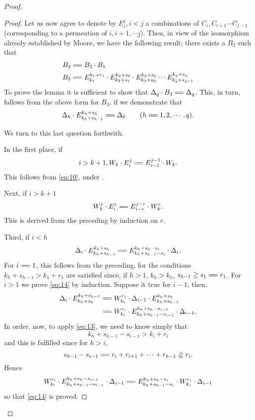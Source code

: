 \documentclass[10pt, twoside]{extarticle}
\newcommand\longeq{=\joinrel=}
\theoremstyle{breaktheorem}
\theoremstyle{mylemma}
\theoremstyle{mydefinition}
\theoremstyle{mycorollary}
\begin{document}
\begin{proof}
\begin{proof}
  Let us now agree to denote by \(E_i^j, i<j\) a combinations of \(C_i, C_{i+1} \cdots C_{j-1}\)
  (corresponding to a permeation of \(i, i+1, \cdots j\)). Then, in view of the
  isomorphism already established by Moore, we have the following result;
  there exists a \(B_3\) such that
  \begin{align*}
    B_2 &\longeq B_3 \cdot B_1 \\
    B_3 &\longeq E_{k_1}^{k_1 + r_1} \cdot E_{k_2 + s_1}^{k_2 + s_2} \cdot E_{k_3 + s_2}^{k_3 + s_3} \cdots E_{k_q + s_{q-1}}^{k_q + s_q}
  \end{align*}
  \indent To prove the lemma it is sufficient to show that \(\Delta_q \cdot B_3 \longeq \Delta_q\). This, in
  turn, follows from the above form for \(B_3\), if we demonstrate that
  \begin{equation}
    \label{eq:12}
    \Delta_h \cdot E_{k_h + s_{h-1}}^{k_h + s_h} \longeq \Delta_k \qquad (h\longeq 1, 2, \cdots, q).
  \end{equation}

  \noindent We turn to this last question forthwith.

  In the first place, if
  \[ i > k+1, W_k \cdot E_i^j \longeq E_{i-1}^{j-1} \cdot W_k. \]
  This follows from \eqref{eq:10}, under .

  Next, if \(i>k+1\)
  \begin{equation}
    \label{eq:13}
    W_k^r \cdot E_i^j \longeq E_{i-r}^{j-r} \cdot W_k^r.
  \end{equation}
  This is derived from the preceding by induction on \(r\).

  Third, if \(i < h\)
  \begin{equation}
    \label{eq:14}
    \Delta_i \cdot E_{k_h + s_{h-1}}^{k_h + s_{h}} \longeq E_{k_h + s_{h-1} - s_i}^{k_h + s_h - s_i} \cdot \Delta_i.
  \end{equation}
  For \(i\longeq 1\), this follows from the preceding, for the conditions \(k_h + s_{h-1} > k_1 + r_1\)
  are satisfied since, if \(h > 1\), \(k_h > k_1\), \(s_{h-1} \geqq s_1 \longeq r_1\). For \(i > 1\)
  we prove \eqref{eq:14} by induction. Suppose it true for \(i-1\), then,
  \begin{align*}
    \Delta_i \cdot E_{k_h + s_h}^{k_h + s_{h-1}} &\longeq W_{k_i}^{r_i} \cdot \Delta_{i-1} \cdot E_{k_h + s_{h-1}}^{k_h + s_h} \\
                                                 &\longeq W_{k_i}^{r_i} \cdot E_{k_h + s_{h-1} - s_{i-1}}^{k_h + s_h - s_{i-1}} \cdot \Delta_{i-1}.
  \end{align*}
  In order, now, to apply \eqref{eq:13}, we need to know simply that
  \[k_h + s_{h-1} - s_{i-1} > k_i + r_i\]
  and this is fulfilled since for \(h > i\),
  \[s_{h-1} - s_{i-1} \longeq r_i + r_{i+1} + \cdots + r_{h-1} \geqq r_i.\]
  Hence
  \[W_{k_i}^{r_i} \cdot E_{k_h + s_{h-1} - s_{i-1}}^{k_h + s_h - s_{i-1}} \cdot \Delta_{i-1} \longeq E_{k_h + s_{h-1} - s_i}^{k_h + s_h - s_i} \cdot W_{k_i}^{r_i} \cdot \Delta_{i-1}\]
  so that \eqref{eq:14} is proved.


\end{proof}
\end{proof}
\end{document}
